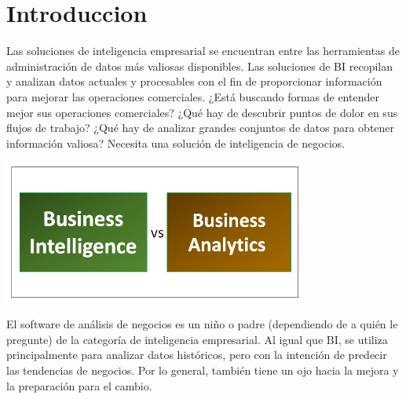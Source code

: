 

\section{Introduccion}



Las soluciones de inteligencia empresarial se encuentran entre las herramientas de administración de datos más valiosas disponibles. Las soluciones de BI recopilan y analizan datos actuales y procesables con el fin de proporcionar información para mejorar las operaciones comerciales. ¿Está buscando formas de entender mejor sus operaciones comerciales? ¿Qué hay de descubrir puntos de dolor en sus flujos de trabajo? ¿Qué hay de analizar grandes conjuntos de datos para obtener información valiosa? Necesita una solución de inteligencia de negocios.
\begin{center}
\includegraphics[width=10cm]{./Imagenes/bivsba}
\end{center}
El software de análisis de negocios es un niño o padre (dependiendo de a quién le pregunte) de la categoría de inteligencia empresarial. Al igual que BI, se utiliza principalmente para analizar datos históricos, pero con la intención de predecir las tendencias de negocios. Por lo general, también tiene un ojo hacia la mejora y la preparación para el cambio. 


